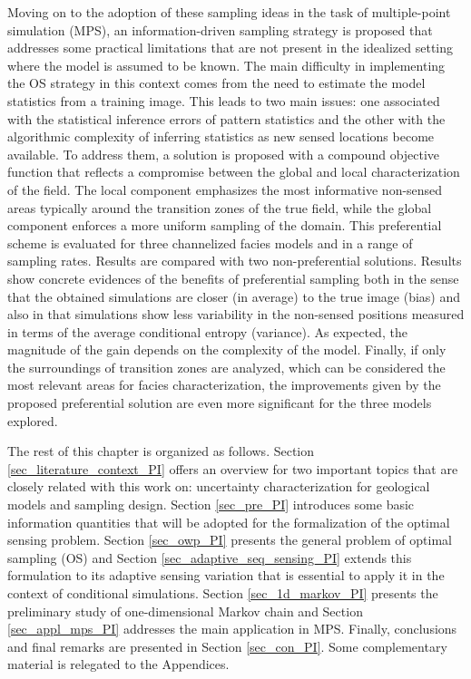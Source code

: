 Moving on to the adoption of these sampling ideas in the task of multiple-point simulation (MPS), an information-driven sampling strategy is proposed that addresses some practical limitations that are not present in the idealized setting {where the model is assumed to be known}. The main difficulty in implementing the OS %
strategy in this context comes from the need to estimate the model statistics from a training image. This leads to two main issues: one associated with the statistical inference errors of pattern statistics and the other with the algorithmic complexity of inferring statistics as new sensed locations become available. To address them, a solution is proposed with a compound objective function that reflects a compromise between the global and local characterization of the field. The local component emphasizes the most informative non-sensed areas typically around the transition zones of the true field, while the global component enforces a more uniform sampling of the domain. This preferential scheme is evaluated for three channelized facies models and in a range of sampling rates. Results are compared with two non-preferential solutions. Results show concrete evidences of the benefits of preferential sampling both in the sense that the obtained simulations are closer (in average) to the true image (bias) and also in that simulations show less variability in the non-sensed positions measured in terms of the average conditional entropy (variance). As expected, the magnitude of the gain depends on the complexity of the model. Finally, if only the surroundings of transition zones are analyzed, which can be considered the most relevant areas for facies characterization, the improvements given by the proposed preferential solution are even more significant for the three models explored.


The rest of this chapter is organized as follows. {Section \ref{sec_literature_context_PI} offers an overview for two important topics that are closely related with this work on: uncertainty characterization for geological models and sampling design.} Section \ref{sec_pre_PI} introduces some basic information quantities that will be adopted for the formalization of the optimal sensing problem. Section \ref{sec_owp_PI} presents the general problem of optimal sampling (OS) and Section \ref{sec_adaptive_seq_sensing_PI} extends this formulation to its adaptive sensing variation that is essential to apply it in the context of conditional simulations. Section \ref{sec_1d_markov_PI} presents the preliminary study of one-dimensional Markov chain and Section \ref{sec_appl_mps_PI} addresses the main application in  MPS. Finally,  conclusions and final remarks are presented in Section \ref{sec_con_PI}. Some complementary material is relegated to the Appendices. 

